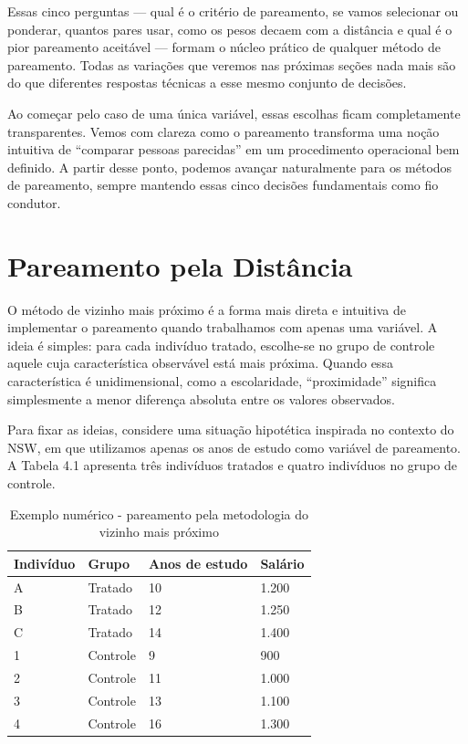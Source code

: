 Essas cinco perguntas — qual é o critério de pareamento, se vamos selecionar ou ponderar, quantos pares usar, como os pesos decaem com a distância e qual é o pior pareamento aceitável — formam o núcleo prático de qualquer método de pareamento. Todas as variações que veremos nas próximas seções nada mais são do que diferentes respostas técnicas a esse mesmo conjunto de decisões.

Ao começar pelo caso de uma única variável, essas escolhas ficam completamente transparentes. Vemos com clareza como o pareamento transforma uma noção intuitiva de “comparar pessoas parecidas” em um procedimento operacional bem definido. A partir desse ponto, podemos avançar naturalmente para os métodos de pareamento, sempre mantendo essas cinco decisões fundamentais como fio condutor.

\section{Pareamento pela Distância}

O método de vizinho mais próximo é a forma mais direta e intuitiva de implementar o pareamento quando trabalhamos com apenas uma variável. A ideia é simples: para cada indivíduo tratado, escolhe-se no grupo de controle aquele cuja característica observável está mais próxima. Quando essa característica é unidimensional, como a escolaridade, “proximidade” significa simplesmente a menor diferença absoluta entre os valores observados.

Para fixar as ideias, considere uma situação hipotética inspirada no contexto do NSW, em que utilizamos apenas os anos de estudo como variável de pareamento. A Tabela 4.1 apresenta três indivíduos tratados e quatro indivíduos no grupo de controle.

\begin{table}[h]
    \centering
    \begin{tabular}{llll}
        Indivíduo & Grupo & Anos de estudo & Salário\\\midrule
        A & Tratado  & 10 & 1.200  \\
        B & Tratado  & 12 & 1.250  \\
        C & Tratado  & 14 & 1.400  \\
        1 & Controle &  9 & 900  \\
        2 & Controle & 11 & 1.000  \\
        3 & Controle & 13 & 1.100  \\
        4 & Controle & 16 & 1.300  \\\bottomrule
    \end{tabular}
    \caption{Exemplo numérico - pareamento pela metodologia do vizinho mais próximo}
    \label{tab:placeholder}
\end{table}

